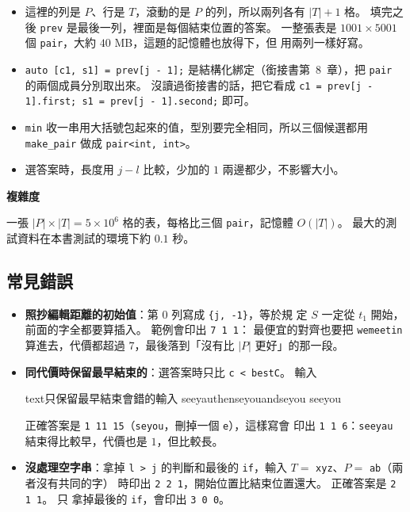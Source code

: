 
\begin{itemize}
\item 這裡的列是 $P$、行是 $T$，滾動的是 $P$ 的列，所以兩列各有 $|T| + 1$ 格。
填完之後 \texttt{prev} 是最後一列，裡面是每個結束位置的答案。 一整張表是
$1001 \times 5001$ 個 \texttt{pair}，大約 $40$ MB，這題的記憶體也放得下，但
用兩列一樣好寫。
\item \texttt{auto [c1, s1] = prev[j - 1];} 是結構化綁定（銜接書第~8~章），把
\texttt{pair} 的兩個成員分別取出來。 沒讀過銜接書的話，把它看成
\texttt{c1 = prev[j - 1].first; s1 = prev[j - 1].second;} 即可。
\item \texttt{min} 收一串用大括號包起來的值，型別要完全相同，所以三個候選都用
\texttt{make\_pair} 做成 \texttt{pair<int, int>}。
\item 選答案時，長度用 $j - l$ 比較，少加的 $1$ 兩邊都少，不影響大小。
\end{itemize}

\textbf{複雜度}

一張 $|P| \times |T| = 5 \times 10^6$ 格的表，每格比三個 \texttt{pair}，記憶體
$O(|T|)$。 最大的測試資料在本書測試的環境下約 $0.1$ 秒。

\subsection{常見錯誤}

\begin{itemize}
\item \textbf{照抄編輯距離的初始值}：第 $0$ 列寫成 \texttt{\{j, -1\}}，等於規
定 $S$ 一定從 $t_1$ 開始，前面的字全都要算插入。 範例會印出 \texttt{7 1 1}：
最便宜的對齊也要把 \texttt{wemeetin} 算進去，代價都超過 $7$，最後落到「沒有比
$|P|$ 更好」的那一段。
\item \textbf{同代價時保留最早結束的}：選答案時只比 \texttt{c < bestC}。 輸入
\begin{code}{text}{只保留最早結束會錯的輸入}
seeyauthenseyouandseyou
seeyou
\end{code}
正確答案是 \texttt{1 11 15}（\texttt{seyou}，刪掉一個 \texttt{e}），這樣寫會
印出 \texttt{1 1 6}：\texttt{seeyau} 結束得比較早，代價也是 $1$，但比較長。
\item \textbf{沒處理空字串}：拿掉 \texttt{l > j} 的判斷和最後的
\texttt{if}，輸入 $T = $ \texttt{xyz}、$P = $ \texttt{ab}（兩者沒有共同的字）
時印出 \texttt{2 2 1}，開始位置比結束位置還大。 正確答案是 \texttt{2 1 1}。 只
拿掉最後的 \texttt{if}，會印出 \texttt{3 0 0}。
\end{itemize}

